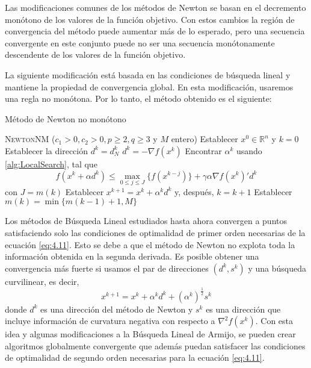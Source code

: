 Las modificaciones comunes de los métodos de Newton se basan en el decremento monótono de los valores de la función objetivo. 
Con estos cambios la región de convergencia del método puede aumentar más de lo esperado, pero una secuencia convergente en este conjunto puede no ser una secuencia monótonamente descendente de los valores de la función objetivo. 

La siguiente modificación está basada en las condiciones de búsqueda lineal y mantiene la propiedad de convergencia global. 
En esta modificación, usaremos una regla no monótona. 
Por lo tanto, el método obtenido es el siguiente:

\begin{algorithm}[H]
\caption{Método de Newton no monótono}\label{alg:NonMonotoneNewton}
\begin{algorithmic}[1]
\Procedure \textsc{NewtonNM} ($c_1>0,c_2>0,p\geq 2, q\geq 3$ y $M$ entero)
\State Establecer $x^0\in\mathbb{R}^n$ y $k=0$
		\State Establecer la dirección $d^k = d_N^k$
	\Else
		\State $d^k = -\nabla f(x^k)$
	\EndIf
	\State Encontrar $\alpha^k$ usando \ref{alg:LocalSearch}, tal que \begin{equation*}
	f(x^k+\alpha d^k) \leq \max_{0\leq j\leq J}\{f(x^{k-j})\}+\gamma\alpha\nabla f(x^k)'d^k
	\end{equation*}
	con $J=m(k)$
	\State Establecer $x^{k+1} = x^k+\alpha^kd^k$ y, después, $k=k+1$
	\State Establecer $m(k) = \min\{m(k-1)+1,M\}$
\EndWhile
\EndProcedure
\end{algorithmic}
\end{algorithm}

Los métodos de Búsqueda Lineal estudiados hasta ahora convergen a puntos satisfaciendo solo las condiciones de optimalidad de primer orden necesarias de la ecuación \ref{eq:4.11}. 
Esto se debe a que el método de Newton no explota toda la información obtenida en la segunda derivada. 
Es posible obtener una convergencia más fuerte si usamos el par de direcciones $(d^k,s^k)$ y una búsqueda curvilinear, es decir,
\begin{equation}
x^{k+1} = x^k + \alpha^kd^k+(\alpha^k)^{\frac{1}{2}}s^k
\label{eq:4.25}
\end{equation}
donde $d^k$ es una dirección del método de Newton y $s^k$ es una dirección que incluye información de curvatura negativa con respecto a $\nabla^2 f(x^k)$. 
Con esta idea y algunas modificaciones a la Búsqueda Lineal de Armijo, se pueden crear algoritmos globalmente convergente que además puedan satisfacer las condiciones de optimalidad de segundo orden necesarias para la ecuación \ref{eq:4.11}.

